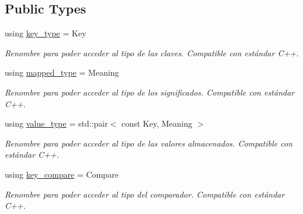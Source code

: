 \subsection*{Public Types}
\begin{DoxyCompactItemize}
\item 
\mbox{\label{classaed2_1_1iterator_afd2dbf717b48e5921b9d7f5c97bdf16e}} 
using \hyperlink{classaed2_1_1iterator_afd2dbf717b48e5921b9d7f5c97bdf16e}{key\+\_\+type} = Key
\begin{DoxyCompactList}\small\item\em Renombre para poder acceder al tipo de las claves. Compatible con estándar C++. \end{DoxyCompactList}\item 
\mbox{\label{classaed2_1_1iterator_a9616435dd0f809fcd47b1c23264c217e}} 
using \hyperlink{classaed2_1_1iterator_a9616435dd0f809fcd47b1c23264c217e}{mapped\+\_\+type} = Meaning
\begin{DoxyCompactList}\small\item\em Renombre para poder acceder al tipo de los significados. Compatible con estándar C++. \end{DoxyCompactList}\item 
\mbox{\label{classaed2_1_1iterator_a6411a2c08b2b7c52f063bef1a168acb6}} 
using \hyperlink{classaed2_1_1iterator_a6411a2c08b2b7c52f063bef1a168acb6}{value\+\_\+type} = std\+::pair$<$ const Key, Meaning $>$
\begin{DoxyCompactList}\small\item\em Renombre para poder acceder al tipo de las valores almacenados. Compatible con estándar C++. \end{DoxyCompactList}\item 
\mbox{\label{classaed2_1_1iterator_a958d31cebad5df42b144eb6da2d44764}} 
using \hyperlink{classaed2_1_1iterator_a958d31cebad5df42b144eb6da2d44764}{key\+\_\+compare} = Compare
\begin{DoxyCompactList}\small\item\em Renombre para poder acceder al tipo del comparador. Compatible con estándar C++. \end{DoxyCompactList}\item 
\mbox{\label{classaed2_1_1iterator_ad4ba975de35932c0cc8af3c25a6748bf}} 

\end{DoxyCompactItemize}
